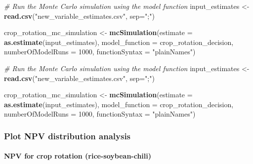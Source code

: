 \documentclass[
]{article}
\newenvironment{Shaded}{\begin{snugshade}}{\end{snugshade}}
\newcommand{\AttributeTok}[1]{\textcolor[rgb]{0.13,0.29,0.53}{#1}}
\newcommand{\CommentTok}[1]{\textcolor[rgb]{0.56,0.35,0.01}{\textit{#1}}}
\newcommand{\DecValTok}[1]{\textcolor[rgb]{0.00,0.00,0.81}{#1}}
\newcommand{\FunctionTok}[1]{\textcolor[rgb]{0.13,0.29,0.53}{\textbf{#1}}}
\newcommand{\NormalTok}[1]{#1}
\newcommand{\OtherTok}[1]{\textcolor[rgb]{0.56,0.35,0.01}{#1}}
\newcommand{\StringTok}[1]{\textcolor[rgb]{0.31,0.60,0.02}{#1}}
\begin{document}
\begin{Shaded}
\begin{Highlighting}[]
\CommentTok{\# Run the Monte Carlo simulation using the model function}
\NormalTok{input\_estimates }\OtherTok{\textless{}{-}} \FunctionTok{read.csv}\NormalTok{(}\StringTok{"new\_variable\_estimates.csv"}\NormalTok{, }\AttributeTok{sep=}\StringTok{";"}\NormalTok{)}

\NormalTok{crop\_rotation\_mc\_simulation }\OtherTok{\textless{}{-}} \FunctionTok{mcSimulation}\NormalTok{(}\AttributeTok{estimate =} \FunctionTok{as.estimate}\NormalTok{(input\_estimates),}
                                            \AttributeTok{model\_function =}\NormalTok{ crop\_rotation\_decision,}
                                            \AttributeTok{numberOfModelRuns =} \DecValTok{1000}\NormalTok{,}
                                            \AttributeTok{functionSyntax =} \StringTok{"plainNames"}\NormalTok{)}

\CommentTok{\# Run the Monte Carlo simulation using the model function}
\NormalTok{input\_estimates }\OtherTok{\textless{}{-}} \FunctionTok{read.csv}\NormalTok{(}\StringTok{"new\_variable\_estimates.csv"}\NormalTok{, }\AttributeTok{sep=}\StringTok{";"}\NormalTok{)}

\NormalTok{crop\_rotation\_mc\_simulation }\OtherTok{\textless{}{-}} \FunctionTok{mcSimulation}\NormalTok{(}\AttributeTok{estimate =} \FunctionTok{as.estimate}\NormalTok{(input\_estimates),}
                                            \AttributeTok{model\_function =}\NormalTok{ crop\_rotation\_decision,}
                                            \AttributeTok{numberOfModelRuns =} \DecValTok{1000}\NormalTok{,}
                                            \AttributeTok{functionSyntax =} \StringTok{"plainNames"}\NormalTok{)}
\end{Highlighting}
\end{Shaded}

\hypertarget{plot-npv-distribution-analysis}{%
\subsubsection{Plot NPV distribution
analysis}\label{plot-npv-distribution-analysis}}

\hypertarget{npv-for-crop-rotation-rice-soybean-chili}{%
\paragraph{NPV for crop rotation
(rice-soybean-chili)}\label{npv-for-crop-rotation-rice-soybean-chili}}
\end{document}

